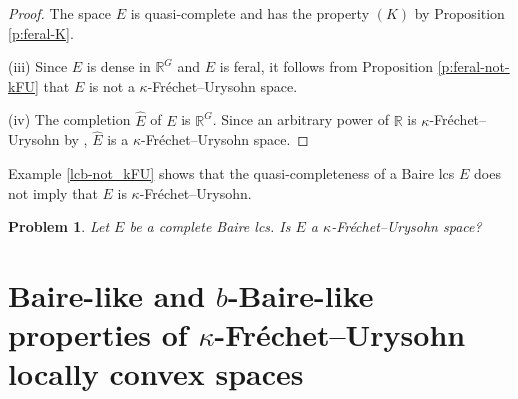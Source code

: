 \documentclass[preprint,11pt]{elsarticle}
\newtheorem{problem}[theorem]{Problem}
\theoremstyle{definition}
\theoremstyle{remark}
\numberwithin{equation}{section}
\numberwithin{theorem}{section}
\newcommand{\IR}{\mathbb{R}}
\begin{document}
\begin{proof}
The space $E$ is quasi-complete and has the property $(K)$ by Proposition \ref{p:feral-K}.
\smallskip


(iii) Since $E$ is dense in $\IR^G$ and $E$ is feral, it follows from Proposition \ref{p:feral-not-kFU} that $E$ is not a $\kappa$-Fr\'{e}chet--Urysohn space.
\smallskip

(iv) The completion $\widehat E$ of $E$ is $\IR^G$.
Since an arbitrary power of $\IR$ is $\kappa$-Fr\'{e}chet--Urysohn by  \cite[Theorem 3.1]{Mrowka}, $\widehat E$ is a $\kappa$-Fr\'{e}chet--Urysohn space.
\end{proof}


Example \ref{lcb-not_kFU} shows that the quasi-completeness of a Baire lcs $E$ does not imply that $E$ is $\kappa$-Fr\'{e}chet--Urysohn.
\begin{problem}
Let $E$ be a complete Baire lcs. Is $E$ a $\kappa$-Fr\'{e}chet--Urysohn space?
\end{problem}



\section{Baire-like and $b$-Baire-like properties of $\kappa$-Fr\'{e}chet--Urysohn locally convex spaces  } \label{sec:kFU-Baire}

\end{document}
